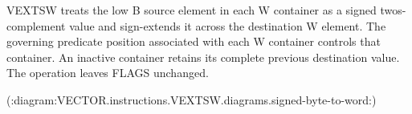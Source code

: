 VEXTSW treats the low B source element in each W container as a signed
two\textquotesingle{}s-complement value and sign-extends it across the destination W element.
The governing predicate position associated with each W container controls
that container.  An inactive container retains its complete previous
destination value.  The operation leaves FLAGS unchanged.

(:diagram:VECTOR.instructions.VEXTSW.diagrams.signed-byte-to-word:)
